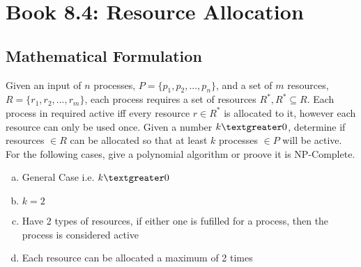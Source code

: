\documentclass[12pt]{article}
\begin{document}

\newcommand{\hmwkClass}{COS 255}
\newcommand{\hmwkSemester}{Spring 2016}

\newcommand{\hmwkAuthorName}{Lukas Leung}
\newcommand{\hmwkAuthorID}{lleung}

\newcommand{\hmwkAssignmentNum}{4}

\newcommand{\hmwkProblemNum}{0}

\newcommand{\hmwkCollaborators}{}
\thispagestyle{fancycollab}



\section{Book 8.4: Resource Allocation}

\subsection*{Mathematical Formulation}
Given an input of $n$ processes, $P = \{p_1, p_2, ..., p_n\}$,  and a set of $m$
resources, $R = \{r_1, r_2, ..., r_m\}$, each process requires a set of resources
$R^{\ast}, R^{\ast} \subseteq R$. Each process in required active iff every resource
$r \in R^{\ast}$ is allocated to it, however each resource can only be used once.
Given a number $k \textgreater 0$, determine if resources $\in R$ can be allocated
so that at least $k$ processes $\in P$ will be active. For the following cases,
give a polynomial algorithm or proove it is NP-Complete.
\begin{enumerate}[(a)]
    \item General Case i.e. $k \textgreater 0$
    \item $k = 2$
    \item Have 2 types of resources, if either one is fufilled for a process, then
        the process is considered active
    \item Each resource can be allocated a maximum of 2 times
\end{enumerate}
\end{document}
